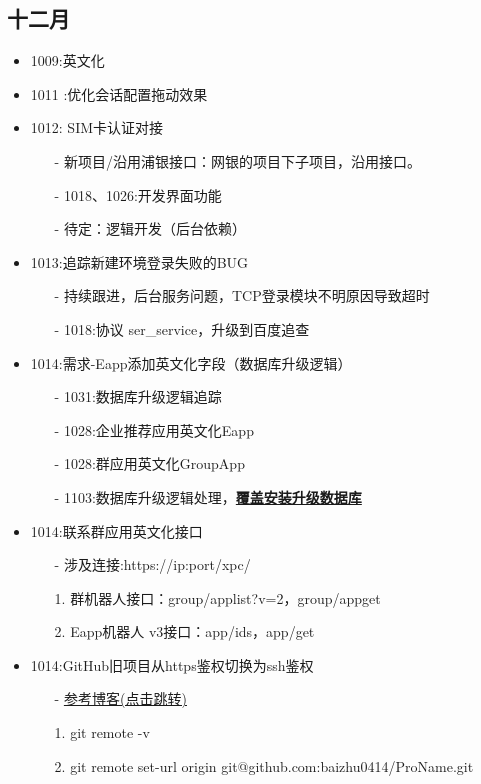 \documentclass[12pt,a4paper]{ctexart}
\begin{document}
	\subsection{十二月}
	\begin{itemize}
		\item 1009:英文化
		\item 1011 :优化会话配置拖动效果
		\item 1012: SIM卡认证对接
		\begin{itemize}
			\item[-] 新项目/沿用浦银接口：网银的项目下子项目，沿用接口。
			\item[-] 1018、1026:开发界面功能
			\item[-] 待定：逻辑开发（后台依赖）
		\end{itemize}
		\item 1013:追踪新建环境登录失败的BUG
		\begin{itemize}
			\item[-] 持续跟进，后台服务问题，TCP登录模块不明原因导致超时
			\item[-] 1018:协议 ser\_service，升级到百度追查
		\end{itemize}
		\item 1014:需求-Eapp添加英文化字段（数据库升级逻辑）
		\begin{itemize}
			\item[-] 1031:数据库升级逻辑追踪
			\item[-] 1028:企业推荐应用英文化Eapp
			\item[-] 1028:群应用英文化GroupApp
			\item[-] 1103:数据库升级逻辑处理，\underline{\textbf{覆盖安装升级数据库}}
		\end{itemize}
		\item 1014:联系群应用英文化接口
		\begin{itemize}
			\item[-] 涉及连接:https://ip:port/xpc/
			\item[1.] 群机器人接口：group/applist?v=2，group/appget
			\item[2.] Eapp机器人 v3接口：app/ids，app/get
		\end{itemize}
		\item 1014:GitHub旧项目从https鉴权切换为ssh鉴权
		\begin{itemize}
			\item[-] \underline{\href{https://blog.csdn.net/weixin_43065003/article/details/126973140}{参考博客(点击跳转)}}
			\item[1.] git remote -v
			\item[2.] git remote set-url origin git@github.com:baizhu0414/ProName.git

\end{itemize}
\end{itemize}
\end{document}
